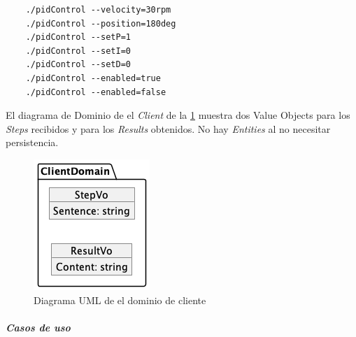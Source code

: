 \begin{verbatim}
    ./pidControl --velocity=30rpm
    ./pidControl --position=180deg
    ./pidControl --setP=1
    ./pidControl --setI=0
    ./pidControl --setD=0
    ./pidControl --enabled=true
    ./pidControl --enabled=false
\end{verbatim}

El diagrama de Dominio de el \textit{Client} de la \cref{fig:Diagrama UML de el dominio de cliente} muestra dos Value Objects para los \textit{Steps} recibidos y para los \textit{Results} obtenidos.
No hay \textit{Entities} al no necesitar persistencia.

\begin{figure}[H]
    \centering
    \includegraphics[height=0.2\textheight]{./part/Proyecto_ejecutivo/memoria_descriptiva/descripcionDelProyecto/client/uml/clientDomain}
    \caption{Diagrama UML de el dominio de cliente}\label{fig:Diagrama UML de el dominio de cliente}
\end{figure}

\subparagraph{Casos de uso}

